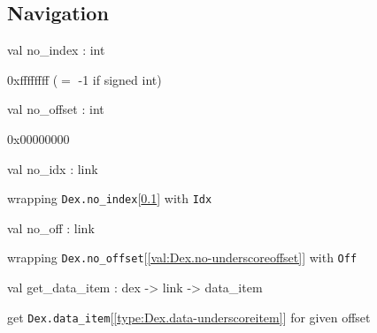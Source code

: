 \documentclass[11pt]{article}
\begin{document}
\subsection{Navigation}




\label{val:Dex.no-underscoreindex}\begin{ocamldoccode}
val no_index : int
\end{ocamldoccode}
\begin{ocamldocdescription}
0xffffffff ($=$ -1 if signed int)


\end{ocamldocdescription}




\label{val:Dex.no-underscoreoffset}\begin{ocamldoccode}
val no_offset : int
\end{ocamldoccode}
\begin{ocamldocdescription}
0x00000000


\end{ocamldocdescription}




\label{val:Dex.no-underscoreidx}\begin{ocamldoccode}
val no_idx : link
\end{ocamldoccode}
\begin{ocamldocdescription}
wrapping {\tt{Dex.no\_index}}[\ref{val:Dex.no-underscoreindex}] with {\tt{Idx}}


\end{ocamldocdescription}




\label{val:Dex.no-underscoreoff}\begin{ocamldoccode}
val no_off : link
\end{ocamldoccode}
\begin{ocamldocdescription}
wrapping {\tt{Dex.no\_offset}}[\ref{val:Dex.no-underscoreoffset}] with {\tt{Off}}


\end{ocamldocdescription}




\label{val:Dex.get-underscoredata-underscoreitem}\begin{ocamldoccode}
val get_data_item : dex -> link -> data_item
\end{ocamldoccode}
\begin{ocamldocdescription}
get {\tt{Dex.data\_item}}[\ref{type:Dex.data-underscoreitem}] for given offset


\end{ocamldocdescription}
\end{document}
